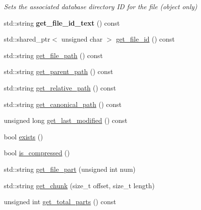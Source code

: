 \begin{DoxyCompactItemize}
\begin{DoxyCompactList}\small\item\em Sets the associated database directory ID for the file (object only) \end{DoxyCompactList}\item 
\mbox{\label{class_vessel_1_1_file_1_1_backup_file_a8b31129882d0fcfbfe66d6d554b607ba}} 
std\+::string {\bfseries get\+\_\+file\+\_\+id\+\_\+text} () const
\item 
std\+::shared\+\_\+ptr$<$ unsigned char $>$ \hyperlink{class_vessel_1_1_file_1_1_backup_file_aceb6698bc333c64694303919eece6628}{get\+\_\+file\+\_\+id} () const
\item 
std\+::string \hyperlink{class_vessel_1_1_file_1_1_backup_file_abc780ca5943b825b42f6769fce3d19d7}{get\+\_\+file\+\_\+path} () const
\item 
std\+::string \hyperlink{class_vessel_1_1_file_1_1_backup_file_abbaa301d14ea7f03bac25b81d2e3149d}{get\+\_\+parent\+\_\+path} () const
\item 
std\+::string \hyperlink{class_vessel_1_1_file_1_1_backup_file_aaa9162554abefd5a1473218917168b65}{get\+\_\+relative\+\_\+path} () const
\item 
std\+::string \hyperlink{class_vessel_1_1_file_1_1_backup_file_a593c9c1cb98892defc3f628d9c393390}{get\+\_\+canonical\+\_\+path} () const
\item 
unsigned long \hyperlink{class_vessel_1_1_file_1_1_backup_file_a3112129047c78a7fc52cf9db6448cdcd}{get\+\_\+last\+\_\+modified} () const
\item 
bool \hyperlink{class_vessel_1_1_file_1_1_backup_file_adb103b7830a36fea586802dbe5aa7288}{exists} ()
\item 
bool \hyperlink{class_vessel_1_1_file_1_1_backup_file_a1a9de8dd9494e2e9639cf0f889586281}{is\+\_\+compressed} ()
\item 
std\+::string \hyperlink{class_vessel_1_1_file_1_1_backup_file_acef6a4af732f6773e341e8a8c0016063}{get\+\_\+file\+\_\+part} (unsigned int num)
\item 
std\+::string \hyperlink{class_vessel_1_1_file_1_1_backup_file_a6a7b3eef42db8e72ae5ed7fbe50c6457}{get\+\_\+chunk} (size\+\_\+t offset, size\+\_\+t length)
\item 
unsigned int \hyperlink{class_vessel_1_1_file_1_1_backup_file_ab206576fee90fd5549d8d12dc6ea5848}{get\+\_\+total\+\_\+parts} () const
\item 
\mbox{\label{class_vessel_1_1_file_1_1_backup_file_af323ffd61bf4576cafb45ab38d24a71d}} 

\end{DoxyCompactItemize}
